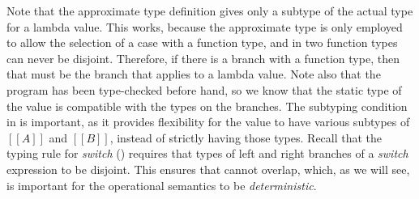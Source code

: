 
Note that the approximate type definition
gives only a subtype of the actual type for a lambda value.
This works, because the
approximate type is only
employed to allow the selection of a case with a function type,
and in \name two function types can never be disjoint. Therefore, if
there is a branch with a function type, then that must be the branch
that applies to a lambda value.
Note also that the program has been type-checked before
hand, so we know that the static type of the value is compatible
with the types on the branches.
The subtyping condition in
 is important, as it provides
flexibility for the value to have various subtypes of $[[A]]$ and $[[B]]$, instead
of strictly having those types. Recall that
the typing rule for \emph{switch} () requires that
types of left and right branches of a \emph{switch}
expression to be disjoint.
This ensures that  cannot overlap, which, as we will
see, is important for the
operational semantics to be \textit{deterministic}.









